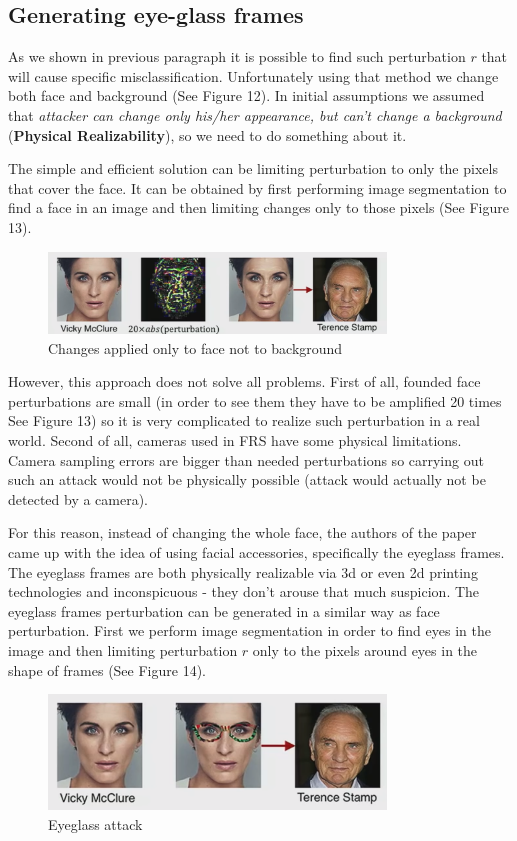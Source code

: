 \subsection{Generating eye-glass frames}

As we shown in previous paragraph it is possible to find such perturbation  $r$ that will cause specific misclassification. Unfortunately using that method we change both face and background (See Figure 12). In initial assumptions we assumed that \textit{attacker can change only his/her appearance, but can’t change a background} (\textbf{Physical Realizability}), so we need to do something about it. 


The simple and efficient solution can be limiting perturbation to only the pixels that cover the face. It can be obtained by first performing image segmentation to find a face in an image and then limiting changes only to those pixels (See Figure 13). 

\begin{figure}[ht]
\centering
\includegraphics[width=0.8\textwidth]{Images/changes-applied-to-face-only.png}
\caption[]{Changes applied only to face not to background\footnotemark[5]}
\end{figure}

However, this approach does not solve all problems. First of all, founded face perturbations are small (in order to see them they have to be amplified 20 times See Figure 13) so it is very complicated to realize such perturbation in a real world. Second of all, cameras used in FRS have some physical limitations. Camera sampling errors are bigger than needed perturbations so carrying out such an attack would not be physically possible (attack would  actually not be detected by a camera).


For this reason, instead of changing the whole face, the authors of the paper came up with the idea of using facial accessories, specifically the eyeglass frames. The eyeglass frames are both physically realizable via 3d or even 2d printing technologies and inconspicuous - they don't arouse that much suspicion. The eyeglass frames perturbation can be generated in a similar way as face perturbation. First we perform image segmentation in order to find eyes in the image and then limiting perturbation $r$ only to the pixels around eyes in the shape of frames (See Figure 14). 

\begin{figure}[ht]
\centering
\includegraphics[width=0.8\textwidth]{Images/eyeglasses-attack.png}
\caption[]{Eyeglass attack\footnotemark[5]}
\end{figure}